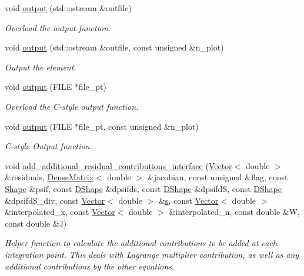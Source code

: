 \begin{DoxyCompactItemize}
void \hyperlink{classoomph_1_1ElasticUpdateFluidInterfaceElement_a46b22d178b248355083a3564e4e92eb0}{output} (std\+::ostream \&outfile)
\begin{DoxyCompactList}\small\item\em Overload the output function. \end{DoxyCompactList}\item 
void \hyperlink{classoomph_1_1ElasticUpdateFluidInterfaceElement_ac193aa64a8223a96e4148a5af456fb64}{output} (std\+::ostream \&outfile, const unsigned \&n\+\_\+plot)
\begin{DoxyCompactList}\small\item\em Output the element. \end{DoxyCompactList}\item 
void \hyperlink{classoomph_1_1ElasticUpdateFluidInterfaceElement_a8baae14bdede6a659e948942d7a08cb5}{output} (F\+I\+LE $\ast$file\+\_\+pt)
\begin{DoxyCompactList}\small\item\em Overload the C-\/style output function. \end{DoxyCompactList}\item 
void \hyperlink{classoomph_1_1ElasticUpdateFluidInterfaceElement_a10b64a463b5ff98475e727b06d95b0ac}{output} (F\+I\+LE $\ast$file\+\_\+pt, const unsigned \&n\+\_\+plot)
\begin{DoxyCompactList}\small\item\em C-\/style Output function. \end{DoxyCompactList}\item 
void \hyperlink{classoomph_1_1ElasticUpdateFluidInterfaceElement_a15c3d2912325ace17676366c1469121f}{add\+\_\+additional\+\_\+residual\+\_\+contributions\+\_\+interface} (\hyperlink{classoomph_1_1Vector}{Vector}$<$ double $>$ \&residuals, \hyperlink{classoomph_1_1DenseMatrix}{Dense\+Matrix}$<$ double $>$ \&jacobian, const unsigned \&flag, const \hyperlink{classoomph_1_1Shape}{Shape} \&psif, const \hyperlink{classoomph_1_1DShape}{D\+Shape} \&dpsifds, const \hyperlink{classoomph_1_1DShape}{D\+Shape} \&dpsifdS, const \hyperlink{classoomph_1_1DShape}{D\+Shape} \&dpsifd\+S\+\_\+div, const \hyperlink{classoomph_1_1Vector}{Vector}$<$ double $>$ \&\hyperlink{cfortran_8h_ab7123126e4885ef647dd9c6e3807a21c}{s}, const \hyperlink{classoomph_1_1Vector}{Vector}$<$ double $>$ \&interpolated\+\_\+x, const \hyperlink{classoomph_1_1Vector}{Vector}$<$ double $>$ \&interpolated\+\_\+n, const double \&W, const double \&J)
\begin{DoxyCompactList}\small\item\em Helper function to calculate the additional contributions to be added at each integration point. This deals with Lagrange multiplier contribution, as well as any additional contributions by the other equations. \end{DoxyCompactList}\item 

\end{DoxyCompactItemize}
